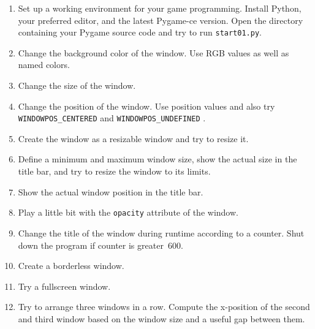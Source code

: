 \begin{enumerate}
	\item Set up a working environment for your game programming. Install Python, your preferred editor, and the latest Pygame-ce version. Open the directory containing your Pygame source code and try to run \texttt{start01.py}.
	
	\item Change the background color of the window. Use RGB values as well as named colors.
	
	\item Change the size of the window.
	
	\item Change the position of the window. Use position values and also try
	\texttt{WINDOWPOS\-\_CENTERED}
	and
	\texttt{WINDOWPOS\-\_UNDEFINED}
	.
	
	\item Create the window as a resizable window and try to resize it.
	
	\item Define a minimum and maximum window size, show the actual size in the title bar, and try to resize the window to its limits.
	
	\item Show the actual window position in the title bar.
	
	\item Play a little bit with the \texttt{opacity} attribute of the window. 
	
	\item Change the title of the window during runtime according to a counter. Shut down the program if counter is greater~600.
	
	\item Create a borderless window.
	
	\item Try a fullscreen window.
	
	\item Try to arrange three windows in a row. Compute the x-position of the second and third window based on the window size and a useful gap between them. 
\end{enumerate}
